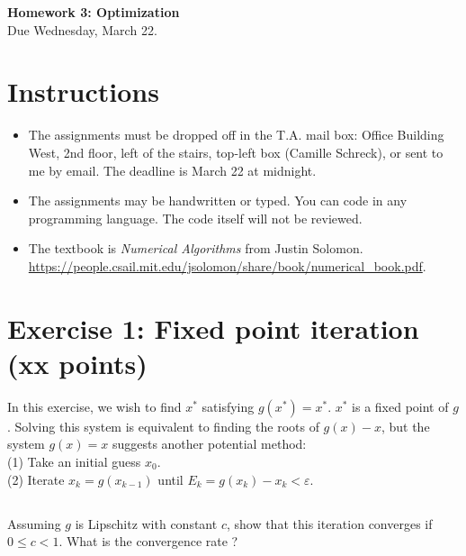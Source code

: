 


\begin{center}
{\large\textbf{Homework 3: Optimization}}\\
Due Wednesday, March 22.
\end{center}

\noindent\makebox[\linewidth]{\rule{\linewidth}{0.6pt}}
 
\section*{Instructions}

\begin{itemize}
\item The assignments must be dropped off in the T.A. mail box: Office Building West, 2nd floor, left of the stairs, top-left box (Camille Schreck), or sent to me by email. The deadline is March 22  at midnight.
\item The assignments may be handwritten or typed. You can code in any programming language. The code itself will not be reviewed. 
\item The textbook is \emph{Numerical Algorithms} from Justin Solomon.\\ \url{https://people.csail.mit.edu/jsolomon/share/book/numerical_book.pdf}.  
\end{itemize}



\noindent\makebox[\linewidth]{\rule{\linewidth}{0.6pt}}

\section*{Exercise 1:  Fixed point iteration \normalsize \textnormal(xx points)}

In this exercise, we wish to find $x^*$ satisfying $g(x^*) = x^*$. $x^*$ is a fixed point of $g$. Solving this system is equivalent to finding the roots of $g(x) - x$, but the system $g(x) = x$ suggests another potential method:\\
(1) Take an initial guess $x_0$.\\
(2) Iterate $x_k = g(x_{k-1})$ until $E_k = g(x_k) - x_k < \varepsilon$. 

\subsection{} Assuming $g$ is Lipschitz with constant $c$, show that this iteration converges if $0 \leq c < 1$. What is the convergence rate ?

